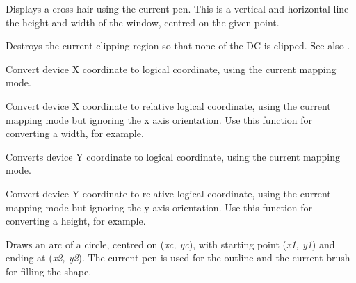 \label{wxdccrosshair}


Displays a cross hair using the current pen. This is a vertical
and horizontal line the height and width of the window, centred
on the given point.


\label{wxdcdestroyclippingregion}


Destroys the current clipping region so that none of the DC is clipped.
See also .


\label{wxdcdevicetologicalx}


Convert device X coordinate to logical coordinate, using the current
mapping mode.


\label{wxdcdevicetologicalxrel}


Convert device X coordinate to relative logical coordinate, using the current
mapping mode but ignoring the x axis orientation.
Use this function for converting a width, for example.


\label{wxdcdevicetologicaly}


Converts device Y coordinate to logical coordinate, using the current
mapping mode.


\label{wxdcdevicetologicalyrel}


Convert device Y coordinate to relative logical coordinate, using the current
mapping mode but ignoring the y axis orientation.
Use this function for converting a height, for example.


\label{wxdcdrawarc}


Draws an arc of a circle, centred on ({\it xc, yc}), with starting point ({\it x1, y1})
and ending at ({\it x2, y2}).   The current pen is used for the outline
and the current brush for filling the shape.

